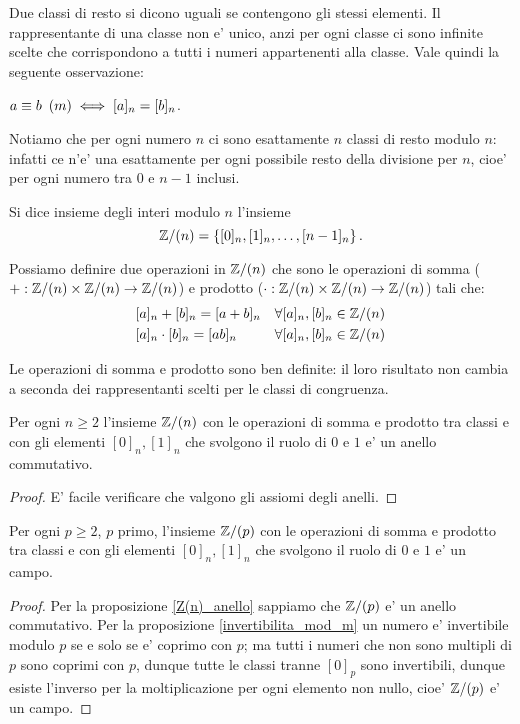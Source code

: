 Due classi di resto si dicono uguali se contengono gli stessi elementi.
Il rappresentante di una classe non e' unico, anzi per ogni classe ci sono infinite scelte che corrispondono a tutti i numeri appartenenti alla classe. Vale quindi la seguente osservazione:
\begin{remark}
    $a \equiv b \ \left(m\right) \iff [a]_n = [b]_n$.
\end{remark}

Notiamo che per ogni numero $n$ ci sono esattamente $n$ classi di resto modulo $n$: infatti ce n'e' una esattamente per ogni possibile resto della divisione per $n$, cioe' per ogni numero tra $0$ e $n-1$ inclusi.

\begin{definition}
    Si dice insieme degli interi modulo $n$ l'insieme
    \begin{equation}
        \mathbb{Z}/(n) = \left\{ [0]_n, [1]_n, \dots, [n-1]_n\right\}.
    \end{equation}
\end{definition}

Possiamo definire due operazioni in $\mathbb{Z}/(n)$ che sono le operazioni di somma ($+ : \mathbb{Z}/(n) \times \mathbb{Z}/(n) \to \mathbb{Z}/(n)$) e prodotto ($\cdot : \mathbb{Z}/(n) \times \mathbb{Z}/(n) \to \mathbb{Z}/(n)$) tali che:
\begin{align}
    &[a]_n + [b]_n = [a+b]_n    &\forall [a]_n, [b]_n \in \mathbb{Z}/(n)\\
    &[a]_n \cdot [b]_n = [ab]_n &\forall [a]_n, [b]_n \in \mathbb{Z}/(n)
\end{align}

\begin{remark}
    Le operazioni di somma e prodotto sono ben definite: il loro risultato non cambia a seconda dei rappresentanti scelti per le classi di congruenza.
\end{remark}

\begin{proposition}\label{Z(n)_anello}
    Per ogni $n \geq 2$ l'insieme $\mathbb{Z}/(n)$ con le operazioni di somma e prodotto tra classi e con gli elementi $[0]_n, [1]_n$ che svolgono il ruolo di $0$ e $1$ e' un anello commutativo.
\end{proposition}
\begin{proof}
    E' facile verificare che valgono gli assiomi degli anelli.
\end{proof}

\begin{proposition}
    Per ogni $p \geq 2$, $p$ primo, l'insieme $\mathbb{Z}/(p)$ con le operazioni di somma e prodotto tra classi e con gli elementi $[0]_n, [1]_n$ che svolgono il ruolo di $0$ e $1$ e' un campo.
\end{proposition}
\begin{proof}
    Per la proposizione \ref{Z(n)_anello} sappiamo che $\mathbb{Z}/(p)$ e' un anello commutativo. Per la proposizione \ref{invertibilita_mod_m} un numero e' invertibile modulo $p$ se e solo se e' coprimo con $p$; ma tutti i numeri che non sono multipli di $p$ sono coprimi con $p$, dunque tutte le classi tranne $[0]_p$ sono invertibili, dunque esiste l'inverso per la moltiplicazione per ogni elemento non nullo, cioe' $\mathbb{Z}/(p)$ e' un campo.
\end{proof}

